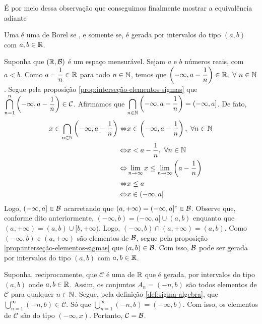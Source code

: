 É por meio dessa observação que conseguimos finalmente mostrar a equivalência adiante\\
\begin{theorem}
\label{teo:equiv-borel}
    Uma \sigal é uma de Borel  se , e somente se, é gerada por intervalos do tipo $(a,b)$ com $a,b \in \mathbb{R}$.
\end{theorem}

\begin{prova}
   Suponha que $(\mathbb{R},\operatorname{\mathcal{B}})$ é um espaço mensurável. 
   Sejam $a$ e $b$ números reais, com $a<b$.
   Como $a - \dfrac{1}{n} \in \mathbb{R}$ para todo $n \in \operatorname{\mathbb{N}}$, temos que 
   $\left(-\infty, a- \dfrac{1}{n}\right) \in \R, \ \forall \ n \in \N$.
   Segue pela proposição \ref{prop:interseção-elementos-sigmas} que
   $\displaystyle \bigcap_{n = 1}^n \left(-\infty, a- \dfrac{1}{n}\right) \in \operatorname{\mathcal{C}}$.
   Afirmamos que 
   $\displaystyle \bigcap_{n \in \operatorname{\mathbb{N}}} \left(-\infty, a - \dfrac{1}{n}\right) = (-\infty, a]$. 
   De fato,
   \begin{align*}
   		x \in \bigcap_{n \in \operatorname{\mathbb{N}}} \left(-\infty, a - \dfrac{1}{n}\right)
   		\Leftrightarrow & x \in \left(-\infty, a - \dfrac{1}{n}\right), \ \forall n \in \operatorname{\mathbb{N}}\\
   		\Leftrightarrow & x < a - \dfrac{1}{n}, \ \forall n \in \operatorname{\mathbb{N}}\\
   		\Leftrightarrow & \displaystyle \lim_{n \to \infty} x \leq \displaystyle \lim_{n \to \infty} \left(a - \dfrac{1}{n}\right)\\
   		\Leftrightarrow & x \leq a\\
   		\Leftrightarrow & x \in (-\infty, a]\\
   \end{align*}
	Logo, $(-\infty, a] \in \operatorname{\mathcal{B}}$ acarretando que $(a, +\infty) = (-\infty, a]^c \in \operatorname{\mathcal{B}}$.
	Observe que, conforme dito anteriormente, $(-\infty, b) = (-\infty,a] \cup (a, b)$ enquanto que $(a, +\infty) = (a, b) \cup [b, +\infty)$.
	Logo, $(-\infty, b) \cap (a, +\infty) = (a,b)$. 
	Como $(-\infty, b)$ e $(a, +\infty)$ são elementos de $\operatorname{\mathcal{B}}$, segue pela proposição
	\ref{prop:interseção-elementos-sigmas} que $(a,b) \in \operatorname{\mathcal{B}}$.
	Com isso, $\operatorname{\mathcal{B}}$ pode ser gerada por intervalos do tipo $(a,b)$ com $a,b \in \mathbb{R}$.
   
	Suponha, reciprocamente, que $\mathcal{C}$ é uma \sigal de $\mathbb{R}$ que é gerada, por intervalos do tipo $(a,b)$ onde $a,b \in \mathbb{R}$.
	Assim, os conjuntos $A_n = (-n, b)$ são todos elementos de $\mathcal{C}$ para qualquer $n \in \operatorname{\mathbb{N}}$.
	Segue, pela definição \ref{def:sigma-algebra}, que 
	$\displaystyle \bigcup_{n = 1}^\infty (-n,b) \in \mathcal{C}$.
	Só que $\displaystyle \bigcup_{n = 1}^\infty (-n,b) = (-\infty, b)$.
	Com isso, os elementos de $\mathcal{C}$ são do tipo $(-\infty, x)$.
	Portanto, $\mathcal{C} = \operatorname{\mathcal{B}}$.

\end{prova}

